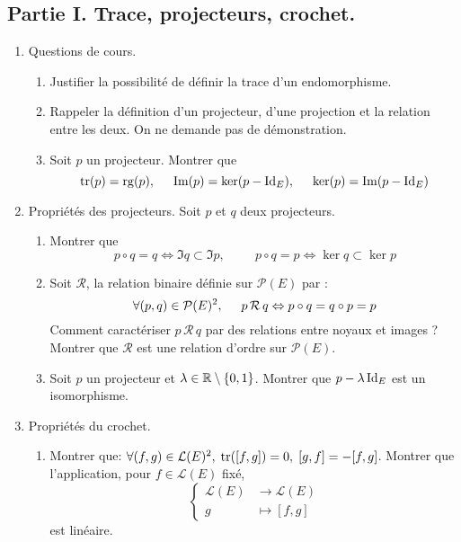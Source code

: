 \subsection*{Partie I. Trace, projecteurs, crochet.}
\begin{enumerate}
  \item Questions de cours.
\begin{enumerate}
  \item Justifier la possibilité de définir la trace d'un endomorphisme.
  \item Rappeler la définition d'un projecteur, d'une projection et la relation entre les deux. On ne demande pas de démonstration.
  \item Soit $p$ un projecteur. Montrer que 
\begin{displaymath}
  \operatorname{tr} (p) = \operatorname{rg}(p),\hspace{0.5cm} \operatorname{Im}(p) = \ker(p-\operatorname{Id}_E),\hspace{0.5cm} \ker(p) = \operatorname{Im}(p-\operatorname{Id}_E)
\end{displaymath}
\end{enumerate}

\item Propriétés des projecteurs. Soit $p$ et $q$ deux projecteurs.
\begin{enumerate}
  \item Montrer que 
\begin{displaymath}
  p \circ q = q \Leftrightarrow \Im q \subset \Im p, \hspace{1cm}
  p \circ q = p \Leftrightarrow \ker q \subset \ker p 
\end{displaymath}
  \item Soit $\mathcal{R}$, la relation binaire définie sur $\mathcal{P}(E)$ par :
\begin{displaymath}
\forall (p,q) \in \mathcal{P}(E)^{2}, \hspace{0.5cm} p \, \mathcal{R} \, q \Leftrightarrow  p \circ q=q \circ p=p  
\end{displaymath}
Comment caractériser $p \, \mathcal{R} \, q$ par des relations entre noyaux et images ? Montrer que $\mathcal{R}$ est une relation d'ordre sur $\mathcal{P}(E)$. 
  \item Soit $p$ un projecteur et $\lambda\in \mathbb{R}\setminus \{0,1\}$. Montrer que $p-\lambda \operatorname{Id}_E$ est un isomorphisme.
\end{enumerate}

  \item Propriétés du crochet.
\begin{enumerate}
  \item Montrer que: $\forall (f,g)\in \mathcal{L}(E)^2,\; \operatorname{tr}([f,g]) = 0,\; [g,f] = - [f,g]$. Montrer que l'application, pour $f\in \mathcal{L}(E)$ fixé,
\begin{displaymath}
  \left\lbrace 
\begin{aligned}
  \mathcal{L}(E) &\rightarrow \mathcal{L}(E)\\ g &\mapsto [f,g]
\end{aligned}
\right. 
\end{displaymath}
est linéaire.


\end{enumerate}
\end{enumerate}
